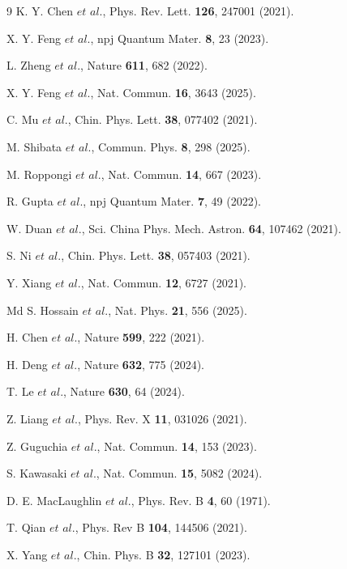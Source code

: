 \documentclass[aps,prl,twocolumn,superscriptaddress]{revtex4-2}
\begin{document}
\begin{thebibliography}{9}
K. Y. Chen $et$ $al$., Phys. Rev. Lett. {\bf 126}, 247001 (2021).




X. Y. Feng $et$ $al$., npj Quantum Mater. {\bf 8}, 23 (2023).

L. Zheng $et$ $al$., Nature {\bf 611}, 682 (2022).

X. Y. Feng $et$ $al$., Nat. Commun. {\bf 16}, 3643 (2025).

C. Mu $et$ $al$., Chin. Phys. Lett. {\bf 38}, 077402 (2021).


M. Shibata $et$ $al$., Commun. Phys. {\bf 8}, 298 (2025).

M. Roppongi $et$ $al$., Nat. Commun. {\bf 14}, 667 (2023).


R. Gupta $et$ $al$., npj Quantum Mater. {\bf 7}, 49 (2022).

W. Duan $et$ $al$., Sci. China Phys. Mech. Astron. {\bf 64}, 107462 (2021).



S. Ni $et$ $al$., Chin. Phys. Lett. {\bf 38}, 057403 (2021).

Y. Xiang $et$ $al$., Nat. Commun. {\bf 12}, 6727 (2021).

Md S. Hossain $et$ $al$., Nat. Phys. {\bf 21}, 556 (2025).


H. Chen $et$ $al$., Nature {\bf 599}, 222 (2021).




H. Deng $et$ $al$., Nature {\bf 632}, 775 (2024).

T. Le $et$ $al$., Nature {\bf 630}, 64 (2024).


Z. Liang $et$ $al$., Phys. Rev. X {\bf 11}, 031026 (2021).


Z. Guguchia $et$ $al$., Nat. Commun. {\bf 14}, 153 (2023).

S. Kawasaki $et$ $al$., Nat. Commun. {\bf 15}, 5082 (2024).

D. E. MacLaughlin $et$ $al$., Phys. Rev. B {\bf 4}, 60 (1971).

T. Qian $et$ $al$., Phys. Rev B {\bf 104}, 144506 (2021).

X. Yang $et$ $al$., Chin. Phys. B {\bf 32}, 127101 (2023).


\end{thebibliography}
\end{document}
